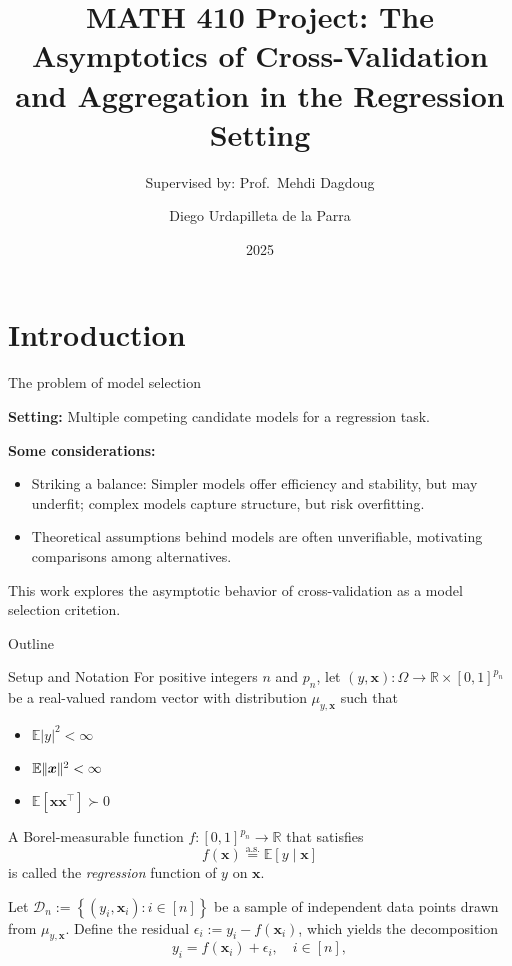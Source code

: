 \documentclass{beamer}
\title[CV for Selection and Aggregation]{MATH 410 Project: The Asymptotics of Cross-Validation and Aggregation in the Regression Setting}
\author[Diego Urdapilleta]{Diego Urdapilleta de la Parra}
\subtitle{Supervised by: Prof.\ Mehdi Dagdoug}
\institute[McGill]{McGill University}
\date{2025}
\newcommand{\R}{\mathbb{R}}
\newcommand{\0}{\emptyset}
\newcommand{\E}{\mathbb{E}}
\newcommand{\Ep}[1]{\mathbb{E}\left[ #1 \right]}
\newcommand{\paren}[1]{\left(#1 \right)}
\newcommand{\set}[1]{\left\{ #1 \right\}}
\newcommand{\norm}[1]{|\hspace{-1pt}|#1 |\hspace{-1pt}|}
\newcommand{\normsq}[1]{\norm{#1}^{2}}
\newcommand{\data}{\mathcal{D}_{n}}
\newcommand{\aseq}{\stackrel{\mathrm{a.s.}}{=}}
\newcommand{\x}{\boldsymbol{x}}
\newcommand{\1}{\mathmybb{1}}
\begin{document}
\begin{frame}
  \titlepage{}
\end{frame}

\section{Introduction}
\begin{frame}{The problem of model selection}

    \textbf{Setting: } Multiple competing candidate models for a regression task.

    \textbf{Some considerations:}
    \begin{itemize}
        \item Striking a balance: Simpler models offer efficiency and stability, but may underfit; complex models capture structure, but risk overfitting.

        \item Theoretical assumptions behind models are often unverifiable, motivating comparisons among alternatives.
    \end{itemize}

    This work explores the asymptotic behavior of cross-validation as a model selection critetion.
\end{frame}

\begin{frame}{Outline}
    \tableofcontents
  \end{frame}

\begin{frame}{Setup and Notation}
    For positive integers $n$ and $p_{n}$, let $(y, \x):\Omega\to\R\times{[0,1]}^{p_{n}}$ be a real-valued random vector with distribution $\mu_{y, \x}$ such that 
    \begin{itemize}
        \item $\E{|y|^{2}}<\infty$
        \item $\E\normsq{\x}<\infty$
        \item $\Ep{\x\x^{\top}}\succ 0$
    \end{itemize}

    A Borel-measurable function \(f:{[0,1]}^{p_{n}} \to \R\) that satisfies
    \[f(\x) \aseq \Ep{y\mid \x}\]
    is called the \emph{regression} function of \(y\) on \(\x\). 
  
    Let \(\data := \set{\paren{y_{i}, \x_{i}}:i\in [n]}\) be a sample of independent data points drawn from \(\mu_{y, \x}\).
    Define the residual \(\epsilon_{i}:= y_{i} - f(\x_{i})\), which yields the decomposition
  \[y_{i} = f(\x_{i}) + \epsilon_{i}, \quad i\in[n],\]
\end{frame}
\end{document}
